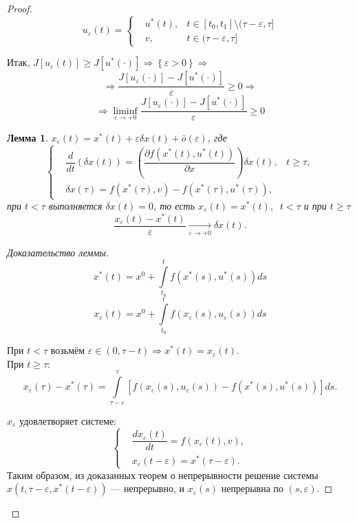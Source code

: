 \documentclass[12pt, a4paper]{article}
\theoremstyle{rusdef}
\newtheorem{lemma}{Лемма}
\renewcommand{\d}{\partial} %
\DeclareMathOperator*{\thus}{\Rightarrow} %
\DeclareMathOperator*{\To}{\longrightarrow}
\begin{document}
\begin{proof}
$$
u_{\varepsilon}(t) = 
\left\{
\begin{aligned}
& u^*(t), & t \in [t_0, t_1] \setminus (\tau - \varepsilon, \tau]  \\
& v, & t \in (\tau - \varepsilon, \tau]
\end{aligned}
\right.
$$

Итак, $J[u_{\varepsilon}(t)] \geqslant J[u^*(\cdot)] \thus \left\{ \varepsilon > 0 \right\} \thus$
$$
\thus \dfrac{J[u_{\varepsilon}(\cdot)] - J[u^*(\cdot)]}{\varepsilon} \geqslant 0 \thus
$$
$$
\thus \liminf\limits_{\varepsilon \to +0} \dfrac{J[u_{\varepsilon}(\cdot)] - J[u^*(\cdot)]}{\varepsilon} \geqslant 0
$$

\begin{lemma}
$x_{\varepsilon}(t) = x^*(t) + \varepsilon\delta x(t) + \bar{o}(\varepsilon)$, где
$$
\left\{
\begin{aligned}
& \dfrac{d}{dt} \left( \delta x(t) \right) = \left( \dfrac{\d f(x^*(t), u^*(t))}{\d x} \right) \delta x(t), \;\;\; t \geqslant \tau, \\
& \delta x(\tau) = f(x^*(\tau), v) - f(x^*(\tau), u^*(\tau)),
\end{aligned}
\right.
$$
при $t < \tau$ выполняется $\delta x(t) = 0$, то есть $x_{\varepsilon}(t) = x^*(t), \;\; t < \tau$ и при $t \geqslant \tau$
$$
\dfrac{x_{\varepsilon}(t) - x^*(t)}{\varepsilon} \To\limits_{\varepsilon \to +0} \delta x(t).
$$
\end{lemma}
\begin{proof}[Доказательство леммы]
$$x^*(t) = x^0 + \int\limits_{t_0}^{t} f(x^*(s), u^*(s)) ds$$
$$x_{\varepsilon}(t) = x^0 + \int\limits_{t_0}^{t} f(x_{\varepsilon}(s), u_{\varepsilon}(s)) ds$$

При $t < \tau$ возьмём $\varepsilon \in (0, \tau - t) \thus x^*(t) = x_{\varepsilon}(t)$.\\
При $t \geqslant \tau \colon$ $$x_{\varepsilon}(\tau) - x^*(\tau) = \int\limits_{\tau - \varepsilon}^{\tau}\left[ f(x_{\varepsilon}(s), u_{\varepsilon}(s)) - f(x^*(s), u^*(s))\right] ds.$$

$x_{\varepsilon}$ удовлетворяет системе:
$$
\left\{
\begin{aligned}
& \dfrac{d x_{\varepsilon}(t)}{dt} = f(x_{\varepsilon}(t), v), \\
& x_{\varepsilon}(t-\varepsilon) = x^*(\tau - \varepsilon).
\end{aligned}
\right.
$$
Таким образом, из доказанных теорем о непрерывности решение системы $x(t, \tau - \varepsilon, x^*(t - \varepsilon))$ --- непрерывно, и $x_{\varepsilon}(s)$ непрерывна по $(s, \varepsilon)$.


\end{proof}
\end{proof}
\end{document}
